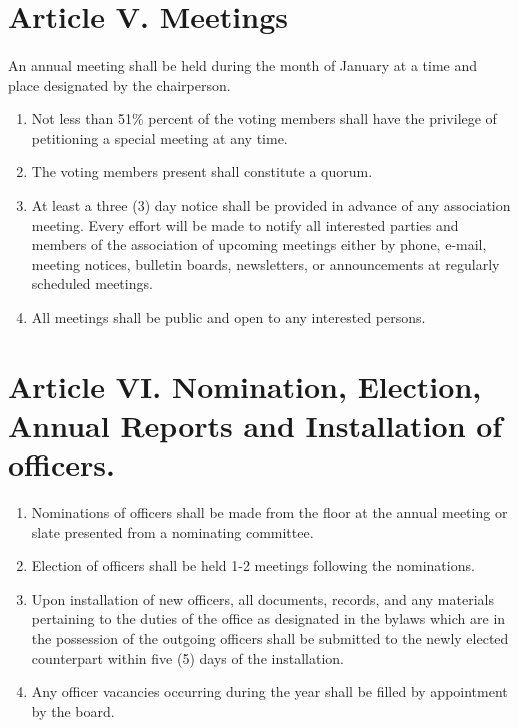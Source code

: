 \documentclass[letterpaper,10pt]{article}
\begin{document}
\section*{Article V. Meetings}
\paragraph{}An annual meeting shall be held during the month of January at a time and place designated by the chairperson.
\begin{enumerate}[label=(\Alph*)]
\item Not less than 51\% percent of the voting members shall have the privilege of petitioning a special meeting at any time.
\item The voting members present shall constitute a quorum.
\item At least a three (3) day notice shall be provided in advance of any association meeting. Every effort will be made to notify all interested parties and members of the association of upcoming meetings either by phone, e-mail, meeting notices, bulletin boards, newsletters, or announcements at regularly scheduled meetings.
\item All meetings shall be public and open to any interested persons.
\end{enumerate}

\section*{Article VI. Nomination, Election, Annual Reports and Installation of officers.}
\begin{enumerate}[label=(\Alph*)]
\item Nominations of officers shall be made from the floor at the annual meeting or slate presented from a nominating committee.
\item Election of officers shall be held 1-2 meetings following the nominations.
\item Upon installation of new officers, all documents, records, and any materials pertaining to the duties of the office as designated in the bylaws which are in the possession of the outgoing officers shall be submitted to the newly elected counterpart within five (5) days of the installation.
\item Any officer vacancies occurring during the year shall be filled by appointment by the board.
\end{enumerate}
\end{document}
